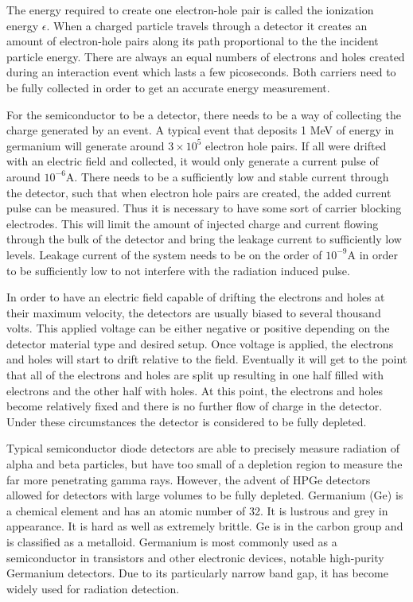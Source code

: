 The energy required to create one electron-hole pair is called the ionization energy $\epsilon$.
When a charged particle travels through a detector it creates an amount of electron-hole pairs along its path proportional to the the incident particle energy.
There are always an equal numbers of electrons and holes created during an interaction event which lasts a few picoseconds.
Both carriers need to be fully collected in order to get an accurate energy measurement.

For the semiconductor to be a detector, there needs to be a way of collecting the charge generated by an event.
A typical event that deposits 1 MeV of energy in germanium will generate around $3\times 10^{5}$ electron hole pairs.
If all were drifted with an electric field and collected, it would only generate a current pulse of around $10^{-6}$A.
There needs to be a sufficiently low and stable current through the detector, such that when electron hole pairs are created, the added current pulse can be measured.
Thus it is necessary to have some sort of carrier blocking electrodes.
This will limit the amount of injected charge and current flowing through the bulk of the detector and bring the leakage current to sufficiently low levels.
Leakage current of the system needs to be on the order of $10^{-9}$A in order to be sufficiently low to not interfere with the radiation induced pulse.

In order to have an electric field capable of drifting the electrons and holes at their maximum velocity, the detectors are usually biased to several thousand volts.
This applied voltage can be either negative or positive depending on the detector material type and desired setup.
Once voltage is applied, the electrons and holes will start to drift relative to the field.
Eventually it will get to the point that all of the electrons and holes are split up resulting in one half filled with electrons and the other half with holes.
At this point, the electrons and holes become relatively fixed and there is no further flow of charge in the detector.
Under these circumstances the detector is considered to be fully depleted.

Typical semiconductor diode detectors are able to precisely measure radiation of alpha and beta particles, but have too small of a depletion region to measure the far more penetrating gamma rays.
However, the advent of HPGe detectors allowed for detectors with large volumes to be fully depleted.
Germanium (Ge) is a chemical element and has an atomic number of 32.
It is lustrous and grey in appearance.
It is hard as well as extremely brittle.
Ge is in the carbon group and is classified as a metalloid.
Germanium is most commonly used as a semiconductor in transistors and other electronic devices, notable high-purity Germanium detectors.
Due to its particularly narrow band gap, it has become widely used for radiation detection. 

